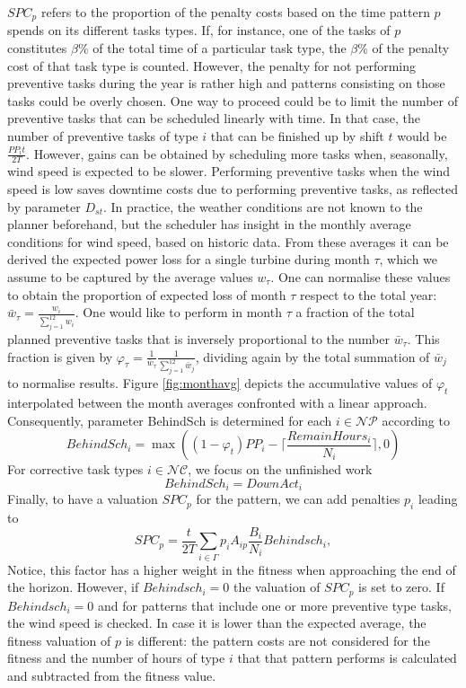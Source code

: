 $SPC_p$ refers to the proportion of the penalty costs based on the time pattern $p$ spends on its different tasks types. If, for instance, one of the tasks of $p$ constitutes $\beta$\% of the total time of a particular task type, the $\beta$\% of the penalty cost of that task type is counted. However, the penalty for not performing preventive tasks during the year is rather high and patterns consisting on those tasks could be overly chosen. One way to proceed could be to limit the number of  preventive tasks that can be scheduled linearly with time.  In that case, the number of preventive tasks of type $i$ that can be finished up by shift $t$ would be $ \frac{PP_it}{2T}$. However, gains can be obtained by scheduling more tasks when, seasonally, wind speed is expected to be slower. Performing preventive tasks when the wind speed is low saves downtime costs due to performing preventive tasks, as reflected by parameter $D_{st}$. 
In practice, the weather conditions are not known to the planner beforehand, but the scheduler has insight in the monthly average conditions for wind speed, based on historic data. From these averages it can be derived the expected power loss for a single turbine during month $\tau$, which we assume to be captured by the average values $w_\tau$. One can normalise these values to obtain the proportion of expected loss of month $\tau$ respect to the total year: $\bar{w}_\tau=\frac{w_i}{\sum_{j=1}^{12}w_i}$. One would like to perform in month $\tau$ a fraction of the total planned preventive tasks that is inversely proportional to the number $\bar{w}_\tau$. This fraction is given by $\varphi_{\tau}=\frac{1}{\bar{w}_\tau}\frac{1}{\sum_{j=1}^{12}\bar{w}_j}$, dividing again by the total summation of $\bar{w}_j$ to normalise results.
% 
Figure \ref{fig:monthavg} depicts the accumulative values of $\varphi_{t}$ interpolated between the month averages confronted with a linear approach.
%
Consequently, parameter BehindSch is determined for each $i\in \mathcal{NP}$ according to
$$BehindSch_{i}=\max((1-\varphi_{t})PP_i -\lceil \frac{RemainHours_i}{N_i}\rceil,0)$$
%
For corrective task types $i\in \mathcal{NC}$, we focus on the unfinished work 
%
$$BehindSch_{i}= DownAct_i$$
%
Finally, to have a valuation $S{PC}_p$ for the pattern, we can add penalties $p_i$ leading to
%
$$SPC_p= \frac{t}{2T}\sum_{i \in \Gamma}p_iA_{ip}\frac{B_i}{N_i}Behindsch_i ,$$
%
Notice, this factor has a higher weight in the fitness when approaching the end of the horizon. However, if $Behindsch_i=0$ the valuation of $S{PC}_p$ is set to zero. If $Behindsch_i=0$ and for patterns that include one or more preventive type tasks, the wind speed is checked. In case it is lower than the expected average, the fitness valuation of $p$ is different: the pattern costs are not considered for the fitness and the number of hours of type $i$ that that pattern performs is calculated and subtracted from the fitness value.


